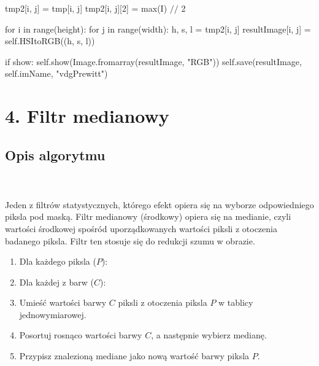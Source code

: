 \documentclass[final,a4paper,openany,12pt]{mwbk}
\begin{document}
\indent \indent \indent tmp2[i, j] = tmp[i, j] \newline
\indent \indent \indent tmp2[i, j][2] = max(I) $//$ 2 \newline

\indent \indent \indent for i in range(height): \newline
\indent \indent \indent for j in range(width): \newline
\indent \indent \indent h, s, l = tmp2[i, j] \newline
\indent \indent \indent resultImage[i, j] = self.HSItoRGB((h, s, l)) \newline

\indent \indent \indent if show: \newline
\indent \indent \indent self.show(Image.fromarray(resultImage, "RGB")) \newline
\indent \indent \indent self.save(resultImage, self.imName, "vdgPrewitt") \newline
\newpage

\section*{4. Filtr medianowy}
\subsection*{Opis algorytmu}
\hfill
\\\\
\indent Jeden z filtrów statystycznych, którego efekt opiera się na wyborze odpowiedniego piksla pod maską. Filtr medianowy (środkowy) opiera się na medianie, czyli wartości środkowej spośród uporządkowanych wartości piksli z otoczenia badanego piksla. Filtr ten stosuje się do redukcji szumu w obrazie.

\begin{enumerate}
	\item Dla każdego piksla ($P$):
	\item Dla każdej z barw ($C$):
	\item Umieść wartości barwy $C$ piksli z otoczenia piksla $P$ w tablicy jednowymiarowej.
	\item Posortuj rosnąco wartości barwy $C$, a następnie wybierz medianę.
	\item Przypisz znalezioną mediane jako nową wartość barwy piksla $P$.
\end{enumerate}
\end{document}
